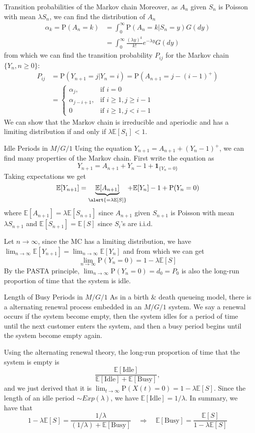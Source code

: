 \documentclass[letterpaper]{beamer}
\def\p{\mathrm P}
\def\E{\mathbb E}
\begin{document}
\begin{frame}{Transition probabilities of the Markov chain}
Moreover, as $A_n$ given $S_n$ is Poisson with mean $\lambda S_n$, we can find the distribution of $A_n$
\begin{align*}
\alpha_k = \p(A_n=k)&=\int_0^{\infty} \p(A_n=k|S_n=y)G(dy)\\
&=\int_0^{\infty} \frac{(\lambda y)^k}{k!}e^{-\lambda y}G(dy)
\end{align*}
from which we can find the transition probability $P_{ij}$ for the Markov chain $\{Y_n, n\ge 0\}$:
\begin{align*}
P_{ij} &= \p(Y_{n+1}=j|Y_n=i)=\p(A_{n+1}=j-(i-1)^+)\\
&=
\begin{cases}
\alpha_j,       & \mbox{if }i=0\\
\alpha_{j-i+1}, & \mbox{if }i\ge 1, j\ge i-1\\
0 &\mbox{if }i\ge 1, j<i-1
\end{cases}
\end{align*}
We can show that the Markov chain is irreducible and aperiodic and has a limiting distribution if and only if $\lambda \E[S_1]<1.$
\end{frame}
\begin{frame}{Idle Periods in $M/G/1$}
Using the equation $Y_{n+1} =A_{n+1}+(Y_n-1)^+$, we can find many properties of the Markov chain. First write the equation as
$$
Y_{n+1}=A_{n+1}+Y_n-1+\mathbf{1}_{\{Y_n=0\}}
$$
Taking expectations we get
\[\E[Y_{n+1}]=\underbrace{\E[A_{n+1}]}_{{\alert{=\lambda\E[S]}}}+\E[Y_n]-1+\p(Y_n=0)\]
where $\E[A_{n+1}]=\lambda\E[S_{n+1}]$ since $A_{n+1}$ given $S_{n+1}$ is Poisson with mean $\lambda S_{n+1}$ and
$\E[S_{n+1}]=\E[S]$ since $S_i$'s are i.i.d.\medskip

Let $n\to\infty$, since the MC has a limiting distribution, we have $\lim_{n\to\infty}\E[Y_{n+1}]=\lim_{n\to\infty}\E[Y_n]$ and from which we can get
$$
\lim_{n\to\infty}\p(Y_n=0)=1-\lambda\E[S]
$$
By the PASTA principle, $\lim_{n\to\infty}\p(Y_n=0)=d_0=P_0$ is also the long-run proportion of time that the system is idle.
\end{frame}
\begin{frame}{Length of Busy Periods in $M/G/1$}
As in a birth \& death queueing model,
there is a alternating renewal process embedded in an $M/G/1$ system.
We say a renewal occurs if the system become empty, then the system idles for a period of time until the next customer enters the system, and then a busy period begins until the system become empty again.

Using the alternating renewal theory, the long-run proportion of time that the system is empty is
$$
\frac{\E[\mbox{Idle}]}{\E[\mbox{Idle}]+\E[\mbox{Busy}]},
$$
and we just derived that it is $\lim_{t\to\infty}\p(X(t)=0)=1-\lambda\E[S]$.
Since the length of an idle period $\sim Exp(\lambda)$, we have $\E[\mbox{Idle}]=1/\lambda.$
In summary, we have that
$$
1-\lambda\E[S]=\frac{1/\lambda}{(1/\lambda)+\E[\mbox{Busy}]}\quad\Rightarrow\quad
\E[\mbox{Busy}]=\frac{\E[S]}{1-\lambda\E[S]}
$$
\end{frame}
\end{document}
